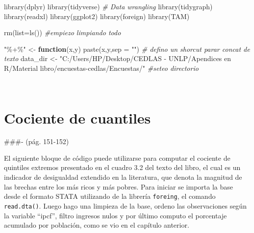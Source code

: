 \documentclass[
]{book}
\newenvironment{Shaded}{\begin{snugshade}}{\end{snugshade}}
\newcommand{\AttributeTok}[1]{\textcolor[rgb]{0.77,0.63,0.00}{#1}}
\newcommand{\CommentTok}[1]{\textcolor[rgb]{0.56,0.35,0.01}{\textit{#1}}}
\newcommand{\ControlFlowTok}[1]{\textcolor[rgb]{0.13,0.29,0.53}{\textbf{#1}}}
\newcommand{\FunctionTok}[1]{\textcolor[rgb]{0.00,0.00,0.00}{#1}}
\newcommand{\NormalTok}[1]{#1}
\newcommand{\OtherTok}[1]{\textcolor[rgb]{0.56,0.35,0.01}{#1}}
\newcommand{\StringTok}[1]{\textcolor[rgb]{0.31,0.60,0.02}{#1}}
\begin{document}
\begin{Shaded}
\begin{Highlighting}[]
\FunctionTok{library}\NormalTok{(dplyr)}
\FunctionTok{library}\NormalTok{(tidyverse) }\CommentTok{\# Data wrangling}
\FunctionTok{library}\NormalTok{(tidygraph)}
\FunctionTok{library}\NormalTok{(readxl)}
\FunctionTok{library}\NormalTok{(ggplot2)}
\FunctionTok{library}\NormalTok{(foreign)}
\FunctionTok{library}\NormalTok{(TAM)}

\FunctionTok{rm}\NormalTok{(}\AttributeTok{list=}\FunctionTok{ls}\NormalTok{())    }\CommentTok{\#empiezo limpiando todo }

\StringTok{"\%+\%"} \OtherTok{\textless{}{-}} \ControlFlowTok{function}\NormalTok{(x,y) }\FunctionTok{paste}\NormalTok{(x,y,}\AttributeTok{sep =} \StringTok{""}\NormalTok{)      }\CommentTok{\# defino un shorcut parar concat de texto}
\NormalTok{data\_dir }\OtherTok{\textless{}{-}} \StringTok{"C:/Users/HP/Desktop/CEDLAS {-} UNLP/Apendices en R/Material libro/encuestas{-}cedlas/Encuestas/"}  \CommentTok{\#seteo directorio }
\end{Highlighting}
\end{Shaded}

~

\hypertarget{cociente-de-cuantiles}{%
\section{Cociente de cuantiles}\label{cociente-de-cuantiles}}

\#\#\#- (pág. 151-152)

El siguiente bloque de código puede utilizarse para computar el cociente de quintiles extremos presentado en el cuadro 3.2 del texto del libro, el cual es un indicador de desigualdad extendido en la literatura, que denota la magnitud de las brechas entre los más ricos y más pobres. Para iniciar se importa la base desde el formato STATA utilizando de la librería \texttt{foreing}, el comando \texttt{read.dta()}. Luego hago una limpieza de la base, ordeno las observaciones según la variable ``ipcf'', filtro ingresos nulos y por último computo el porcentaje acumulado por población, como se vio en el capítulo anterior.
\end{document}
